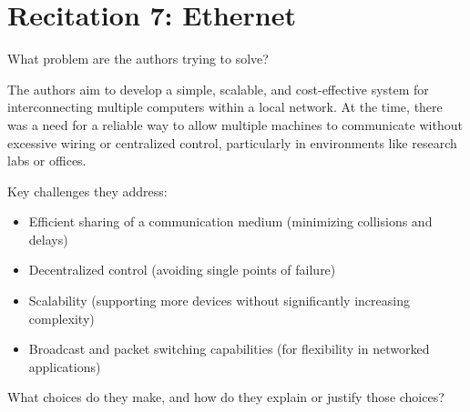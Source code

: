 \documentclass[a4paper]{article}
\begin{document}
\section*{Recitation 7: Ethernet}

\begin{Exercise}
    What problem are the authors trying to solve?
\end{Exercise} 
\begin{Solution}
    The authors aim to develop a simple, scalable, and cost-effective system for interconnecting multiple computers within a local network. At the time, there was a need for a reliable way to allow multiple machines to communicate without excessive wiring or centralized control, particularly in environments like research labs or offices.

    Key challenges they address:
    \begin{itemize}
    \item Efficient sharing of a communication medium (minimizing collisions and delays)
    \item Decentralized control (avoiding single points of failure)
    \item Scalability (supporting more devices without significantly increasing complexity)
    \item Broadcast and packet switching capabilities (for flexibility in networked applications)
    \end{itemize}
\end{Solution}
\begin{Exercise}
    What choices do they make, and how do they explain or justify those choices?
\end{Exercise}
\end{document}
